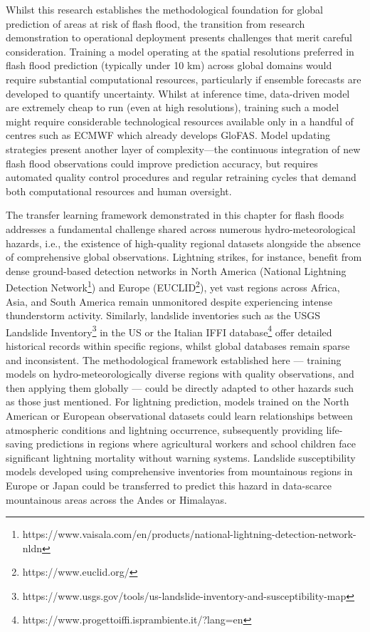 Whilst  this research establishes the methodological foundation for global prediction of areas at risk of flash flood, the transition from research demonstration to operational deployment presents challenges that merit careful consideration. Training a model operating at the spatial resolutions preferred in flash flood prediction (typically under 10 km) across global domains would require substantial computational resources, particularly if ensemble forecasts are developed to quantify uncertainty. Whilst at inference time, data-driven model are extremely cheap to run (even at high resolutions), training such a model might require considerable technological resources available only in a handful of centres such as ECMWF which already develops GloFAS. Model updating strategies present another layer of complexity—the continuous integration of new flash flood observations could improve prediction accuracy, but requires automated quality control procedures and regular retraining cycles that demand both computational resources and human oversight. 

The  transfer learning framework demonstrated in this chapter for flash floods addresses a fundamental challenge shared across numerous hydro-meteorological hazards, i.e., the existence of high-quality regional datasets alongside the absence of comprehensive global observations. Lightning strikes, for instance, benefit from dense ground-based detection networks in North America (National Lightning Detection Network\footnote{https://www.vaisala.com/en/products/national-lightning-detection-network-nldn}) and Europe (EUCLID\footnote{https://www.euclid.org/}), yet vast regions across Africa, Asia, and South America remain unmonitored despite experiencing intense thunderstorm activity. Similarly, landslide inventories such as the USGS Landslide Inventory\footnote{https://www.usgs.gov/tools/us-landslide-inventory-and-susceptibility-map} in the US or the Italian IFFI database\footnote{https://www.progettoiffi.isprambiente.it/?lang=en} offer detailed historical records within specific regions, whilst global databases remain sparse and inconsistent. The methodological framework established here — training models on hydro-meteorologically diverse regions with quality observations, and then applying them globally — could be directly adapted to other hazards such as those just mentioned. For lightning prediction, models trained on the North American or European observational datasets could learn relationships between atmospheric conditions and lightning occurrence, subsequently providing life-saving predictions in regions where agricultural workers and school children face significant lightning mortality without warning systems. Landslide susceptibility models developed using comprehensive inventories from mountainous regions in Europe or Japan could be transferred to predict this hazard in data-scarce mountainous areas across the Andes or Himalayas.

